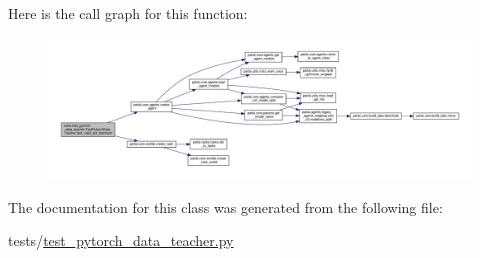 Here is the call graph for this function\+:
\nopagebreak
\begin{figure}[H]
\begin{center}
\leavevmode
\includegraphics[width=350pt]{classtests_1_1test__pytorch__data__teacher_1_1TestPytorchDataTeacher_a2c83da3833b551a1e15e6cec4a8589eb_cgraph}
\end{center}
\end{figure}


The documentation for this class was generated from the following file\+:\begin{DoxyCompactItemize}
\item 
tests/\hyperlink{test__pytorch__data__teacher_8py}{test\+\_\+pytorch\+\_\+data\+\_\+teacher.\+py}\end{DoxyCompactItemize}
